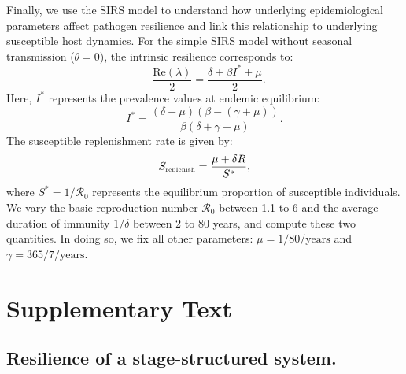 \documentclass[12pt]{article}
\newcommand{\tsub}[2]{#1_{{\textrm{\tiny #2}}}}
\begin{document}
Finally, we use the SIRS model to understand how underlying epidemiological parameters affect pathogen resilience and link this relationship to underlying susceptible host dynamics.
For the simple SIRS model without seasonal transmission ($\theta = 0$), the intrinsic resilience corresponds to:
\begin{equation}
-\frac{\mathrm{Re}(\lambda)}{2} = \frac{\delta + \beta I^{\ast} + \mu}{2}.
\end{equation}
Here, $I^{\ast}$ represents the prevalence values at endemic equilibrium:
\begin{equation}
I^{\ast} = \frac{(\delta + \mu)(\beta - (\gamma + \mu))}{\beta(\delta + \gamma + \mu)}.
\end{equation}
The susceptible replenishment rate is given by:
\begin{equation}
\tsub{S}{replenish} = \frac{\mu + \delta R}{S^\ast},
\end{equation}
where $S^\ast = 1/\mathcal R_0$ represents the equilibrium proportion of susceptible individuals.
We vary the basic reproduction number $\mathcal R_0$ between 1.1 to 6 and the average duration of immunity $1/\delta$ between 2 to 80 years, and compute these two quantities.
In doing so, we fix all other parameters: $\mu=1/80/\mathrm{years}$ and $\gamma=365/7/\mathrm{years}$.

\pagebreak


\setcounter{figure}{0}
\setcounter{equation}{0}
\renewcommand{\thefigure}{S\arabic{figure}}
\renewcommand{\theequation}{S\arabic{equation}}

\section*{Supplementary Text}

\subsection*{Resilience of a stage-structured system.}
\end{document}
